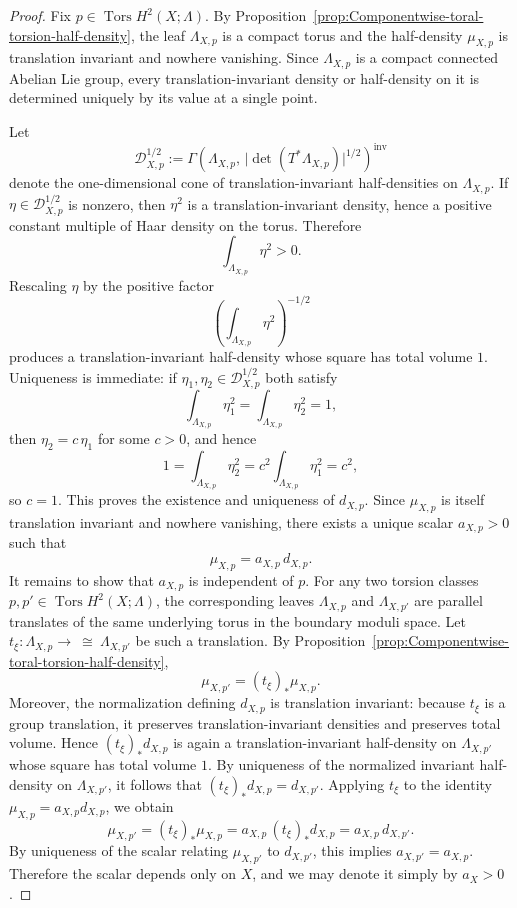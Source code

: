 \documentclass[12pt]{amsart}
\numberwithin{equation}{section}
\begin{document}
\begin{proof}
Fix $p\in \operatorname{Tors}H^2(X;\Lambda)$. By Proposition~\ref{prop:Componentwise-toral-torsion-half-density},
the leaf $\Lambda_{X,p}$ is a compact torus and the half-density $\mu_{X,p}$ is translation invariant and
nowhere vanishing. Since $\Lambda_{X,p}$ is a compact connected Abelian Lie group, every translation-invariant
density or half-density on it is determined uniquely by its value at a single point.

Let
\[
\mathscr D_{X,p}^{1/2}
:=
\Gamma\!\left(
\Lambda_{X,p},\,
\bigl|\det(T^*\Lambda_{X,p})\bigr|^{1/2}
\right)^{\mathrm{inv}}
\]
denote the one-dimensional cone of translation-invariant half-densities on $\Lambda_{X,p}$. If
$\eta\in \mathscr D_{X,p}^{1/2}$ is nonzero, then $\eta^2$ is a translation-invariant density, hence a positive
constant multiple of Haar density on the torus. Therefore
\[
\int_{\Lambda_{X,p}} \eta^2>0.
\]
Rescaling $\eta$ by the positive factor
\[
\left(\int_{\Lambda_{X,p}} \eta^2\right)^{-1/2}
\]
produces a translation-invariant half-density whose square has total volume $1$. Uniqueness is immediate:
if $\eta_1,\eta_2\in \mathscr D_{X,p}^{1/2}$ both satisfy
\[
\int_{\Lambda_{X,p}} \eta_1^2
=
\int_{\Lambda_{X,p}} \eta_2^2
=1,
\]
then \(\eta_2=c\,\eta_1\) for some \(c>0\), and hence
\[
1=\int_{\Lambda_{X,p}} \eta_2^2
=
c^2\int_{\Lambda_{X,p}} \eta_1^2
=
c^2,
\]
so \(c=1\). This proves the existence and uniqueness of \(d_{X,p}\). Since \(\mu_{X,p}\) is itself translation invariant and nowhere vanishing, there exists a unique scalar
\(a_{X,p}>0\) such that
\[
\mu_{X,p}=a_{X,p}\,d_{X,p}.
\]
It remains to show that \(a_{X,p}\) is independent of \(p\). For any two torsion classes \(p,p'\in \operatorname{Tors}H^2(X;\Lambda)\), the corresponding leaves
\(\Lambda_{X,p}\) and \(\Lambda_{X,p'}\) are parallel translates of the same underlying torus in the boundary
moduli space. Let $t_\xi\colon \Lambda_{X,p}\to{\ \cong\ }\Lambda_{X,p'}$ be such a translation. By Proposition~\ref{prop:Componentwise-toral-torsion-half-density},
\[
\mu_{X,p'}=(t_\xi)_*\mu_{X,p}.
\]
Moreover, the normalization defining \(d_{X,p}\) is translation invariant: because \(t_\xi\) is a group
translation, it preserves translation-invariant densities and preserves total volume. Hence $(t_\xi)_*d_{X,p}$ is again a translation-invariant half-density on \(\Lambda_{X,p'}\) whose square has total volume \(1\).
By uniqueness of the normalized invariant half-density on \(\Lambda_{X,p'}\), it follows that $(t_\xi)_*d_{X,p}=d_{X,p'}.$ Applying \(t_\xi\) to the identity \(\mu_{X,p}=a_{X,p}d_{X,p}\), we obtain
\[
\mu_{X,p'}
=
(t_\xi)_*\mu_{X,p}
=
a_{X,p}\,(t_\xi)_*d_{X,p}
=
a_{X,p}\,d_{X,p'}.
\]
By uniqueness of the scalar relating \(\mu_{X,p'}\) to \(d_{X,p'}\), this implies $a_{X,p'}=a_{X,p}.$ Therefore the scalar depends only on \(X\), and we may denote it simply by \(a_X>0\).

\end{proof}
\end{document}
